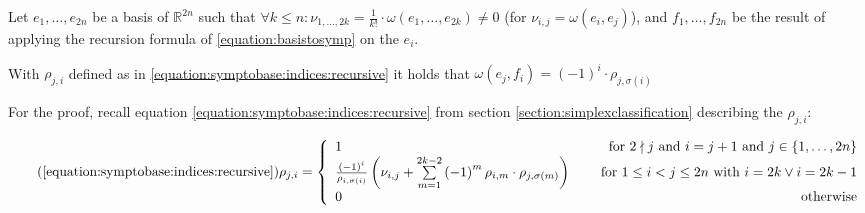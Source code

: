 \documentclass[../SymplecticSimplices.tex]{subfiles}
\begin{document}
\begin{lemma}
  \label{lemma:basistosymp:rho}
  Let \( e_1, \dots, e_{2n} \) be a basis of \( \mathbb{R}^{2n} \) such that \( \forall k \leq n : \nu_{1,\dots,2k } = \frac{1}{k!} \cdot \omega \left( e_1, \dots, e_{2k} \right) \neq 0 \) (for \( \nu_{i,j} = \omega \left( e_i, e_j \right) \)), and \( f_1, \dots, f_{2n} \) be the result of applying the recursion formula of \eqref{equation:basistosymp} on the \( e_i \).

  With \( \rho_{j,i} \) defined as in \eqref{equation:symptobase:indices:recursive} it holds that \( \omega \left( e_j, f_i \right) = \left( -1 \right)^i \cdot \rho_{j, \sigma \left( i \right)} \)
\end{lemma}

For the proof, recall equation \eqref{equation:symptobase:indices:recursive} from section \ref{section:simplexclassification} describing the \( \rho_{j,i} \):

\begin{equation}
  \tag{\ref{equation:symptobase:indices:recursive}}
  \rho_{j,i} = \left\lbrace
  \begin{array}{llr}
    1 & & \textnormal{ for } 2 \nmid j \textnormal{ and } i = j + 1  \textnormal{ and } j \in \left\lbrace 1, \dots, 2n \right\rbrace \\
    \frac{\left( -1 \right) ^ i}{\rho_{i, \sigma\left( i \right)}} \left( \nu_{i,j} + \sum \limits _{m=1} ^{2k-2} \left( -1 \right) ^m \rho_{i, m} \cdot \rho_{j, \sigma \left( m \right)} \right) & & \textnormal{ for } 1 \leq i < j \leq 2n \textnormal { with } i = 2k \lor i=2k-1 \\
    0 & & \textnormal{otherwise}
  \end{array}
  \right.
\end{equation}
\end{document}
